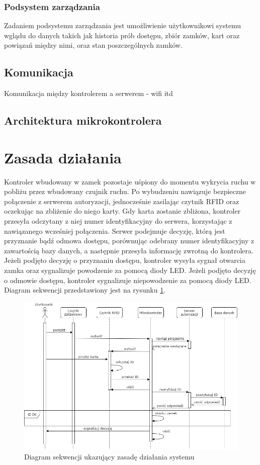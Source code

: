 \subsubsection{Podsystem zarządzania}
Zadaniem podsystemu zarządzania jest umożliwienie użytkownikowi systemu wglądu do danych takich jak historia prób dostępu, zbiór zamków, kart oraz powiązań między nimi, oraz stan poszczególnych zamków.

\subsection{Komunikacja}

Komunikacja między kontrolerem a serwerem - wifi itd

\subsection{Architektura mikrokontrolera}

\section{Zasada działania}
Kontroler wbudowany w zamek pozostaje uśpiony do momentu wykrycia ruchu w pobliżu przez wbudowany czujnik ruchu. Po wybudzeniu nawiązuje bezpieczne połączenie z serwerem autoryzacji, jednocześnie zasilając czytnik RFID oraz oczekując na zbliżenie do niego karty. Gdy karta zostanie zbliżona, kontroler przesyła odczytany z niej numer identyfikacyjny do serwera, korzystając z nawiązanego wcześniej połączenia. Serwer podejmuje decyzję, którą jest przyznanie bądź odmowa dostępu, porównując odebrany numer identyfikacyjny z zawartością bazy danych, a następnie przesyła informację zwrotną do kontrolera. Jeżeli podjęto decyzję o przyznaniu dostępu, kontroler wysyła sygnał otwarcia zamka oraz sygnalizuje powodzenie za pomocą diody LED. Jeżeli podjęto decyzję o odmowie dostępu, kontroler sygnalizuje niepowodzenie za pomocą diody LED. Diagram sekwencji przedstawiony jest na rysunku \ref{fig:sequence1}.

\begin{figure}[]
        \includegraphics[width=\linewidth]{chapters/images/sequence1.png}
        \caption{Diagram sekwencji ukazujący zasadę działania systemu}
        \label{fig:sequence1}
\end{figure}

